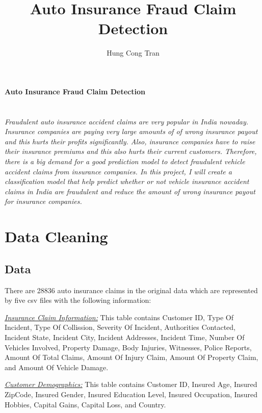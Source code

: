 \documentclass[oneside,12pt,reqno]{amsart}
\theoremstyle{definition}
\begin{document}
\title[]{Auto Insurance Fraud Claim Detection}


\author{Hung Cong Tran}

\centerline{\textbf{\Large Auto Insurance Fraud Claim Detection}}

\section*{}
\textit{Fraudulent auto insurance accident claims are very popular in India nowaday. Insurance companies are  paying very large amounts of of wrong insurance payout and this hurts their profits significantly. Also, insurance companies have to raise their insurance premiums and this also hurts their current customers. Therefore, there is a big demand for a good prediction model to detect fraudulent vehicle accident claims from insurance companies. In this project, I will create a classification model that help predict whether or not vehicle insurance accident claims in India are fraudulent and reduce the amount of wrong insurance payout for insurance companies.}


\section{Data Cleaning}
\subsection{Data}

There are 28836 auto insurance claims in the original data which are represented by five csv files with the following information:

\underline{\textit{Insurance Claim Information:}} This table contains Customer ID, Type Of Incident, Type Of Collission, Severity Of Incident, Authorities Contacted, Incident State, Incident City, Incident Addresses, Incident Time, Number Of Vehicles Involved, Property Damage, Body Injuries, Witnesses, Police Reports, Amount Of Total Claims, Amount Of Injury Claim, Amount Of Property Claim, and Amount Of Vehicle Damage.

\underline{\textit{Customer Demographics:}} This table contains Customer ID, Insured Age, Insured ZipCode, Insured Gender, Insured Education Level, Insured Occupation, Insured Hobbies, Capital Gains, Capital Loss, and Country.
\end{document}
